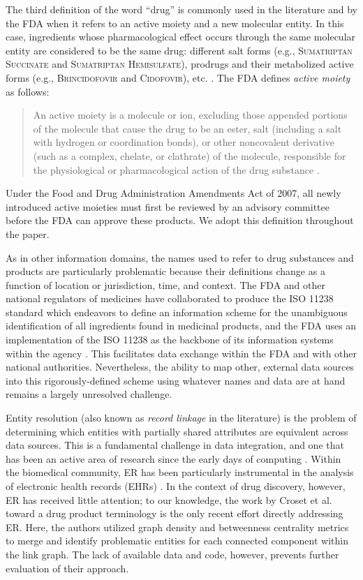 \documentclass{bmcart}
\begin{document}
The third definition of the word ``drug'' is commonly used in
the literature and by the FDA when it refers to an active moiety
and a new molecular entity. In this case, ingredients whose
pharmacological effect occurs through the same molecular entity are
considered to be the same drug: different salt forms (e.g., 
\textsc{Sumatriptan Succinate} and \textsc{Sumatriptan Hemisulfate}), 
prodrugs and their metabolized active forms (e.g., \textsc{Brincidofovir} 
and \textsc{Cidofovir}), etc. \cite{NME}. The FDA defines \emph{active
  moiety} as follows:
\begin{quote}An active moiety is a molecule or
ion, excluding those appended portions of the molecule that cause the
drug to be an ester, salt (including a salt with hydrogen or
coordination bonds), or other noncovalent derivative (such as a
complex, chelate, or clathrate) of the molecule, responsible for the
physiological or pharmacological action of the drug
substance \cite{CFR2012}.
\end{quote}
Under the Food and Drug Administration Amendments Act of 2007, 
all newly introduced active moieties must first be reviewed by 
an advisory committee before the FDA can approve these products. 
We adopt this definition throughout the paper.

As in other information domains, the names used to refer to drug
substances and products are particularly problematic because their
definitions change as a function of location or jurisdiction, time, and
context. The FDA and other national regulators of medicines have
collaborated to produce the ISO 11238 standard \cite{ISO11238} which
endeavors to define an information scheme for the unambiguous
identification of all ingredients found in medicinal products, and the
FDA uses an implementation of the ISO 11238 as the backbone of its
information systems within the agency \cite{GSRS}. This facilitates
data exchange within the FDA and with other national authorities.
Nevertheless, the ability to map other, external data sources into
this rigorously-defined scheme using whatever names and data are at
hand remains a largely unresolved challenge. 

Entity resolution (also known as \emph{record linkage} in the
literature) is the problem of determining which entities with
partially shared attributes are equivalent across data sources. This
is a fundamental challenge in data integration, and one that has been
an active area of research since the early days of computing
\cite{Newcombe1959}. Within the biomedical community, ER has been
particularly instrumental in the analysis of electronic health records
(EHRs) \cite{Karr2019}. In the context of drug discovery, however, ER
has received little attention; to our knowledge, the work by Croset
et al. toward a drug product terminology \cite{Croset2015} is the only
recent effort directly addressing ER. Here, the authors utilized
graph density and betweenness centrality metrics to merge and identify 
problematic entities for each connected component within the link
graph. The lack of available data and code, however, prevents further
evaluation of their approach.
\end{document}
